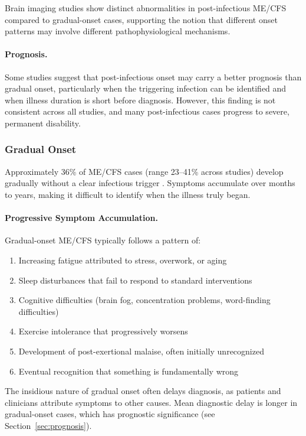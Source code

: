 Brain imaging studies show distinct abnormalities in post-infectious ME/CFS compared to gradual-onset cases, supporting the notion that different onset patterns may involve different pathophysiological mechanisms.

\paragraph{Prognosis.}
Some studies suggest that post-infectious onset may carry a better prognosis than gradual onset, particularly when the triggering infection can be identified and when illness duration is short before diagnosis. However, this finding is not consistent across all studies, and many post-infectious cases progress to severe, permanent disability.

\subsubsection{Gradual Onset}

Approximately 36\% of ME/CFS cases (range 23--41\% across studies) develop gradually without a clear infectious trigger \cite{Jason2019onset}. Symptoms accumulate over months to years, making it difficult to identify when the illness truly began.

\paragraph{Progressive Symptom Accumulation.}
Gradual-onset ME/CFS typically follows a pattern of:
\begin{enumerate}
    \item Increasing fatigue attributed to stress, overwork, or aging
    \item Sleep disturbances that fail to respond to standard interventions
    \item Cognitive difficulties (brain fog, concentration problems, word-finding difficulties)
    \item Exercise intolerance that progressively worsens
    \item Development of post-exertional malaise, often initially unrecognized
    \item Eventual recognition that something is fundamentally wrong
\end{enumerate}

The insidious nature of gradual onset often delays diagnosis, as patients and clinicians attribute symptoms to other causes. Mean diagnostic delay is longer in gradual-onset cases, which has prognostic significance (see Section~\ref{sec:prognosis}).

